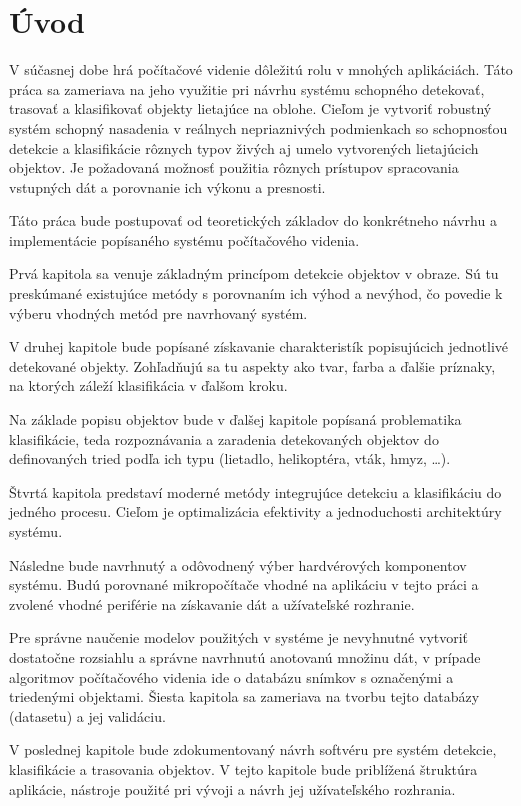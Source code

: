 \chapter*{Úvod}
{}

V súčasnej dobe hrá počítačové videnie dôležitú rolu v mnohých aplikáciách. Táto práca sa zameriava na jeho využitie pri návrhu systému schopného detekovať, trasovať a klasifikovať objekty lietajúce na oblohe. Cieľom je vytvoriť robustný systém schopný nasadenia v reálnych nepriaznivých podmienkach so schopnosťou detekcie a klasifikácie rôznych typov živých aj umelo vytvorených lietajúcich objektov. Je požadovaná možnosť použitia rôznych prístupov spracovania vstupných dát a porovnanie ich výkonu a presnosti.

Táto práca bude postupovať od teoretických základov do konkrétneho návrhu a implementácie popísaného systému počítačového videnia.

Prvá kapitola sa venuje základným princípom detekcie objektov v obraze. Sú tu preskúmané existujúce metódy s porovnaním ich výhod a nevýhod, čo povedie k výberu vhodných metód pre navrhovaný systém.

V druhej kapitole bude popísané získavanie charakteristík popisujúcich jednotlivé detekované objekty. Zohľadňujú sa tu aspekty ako tvar, farba a ďalšie príznaky, na ktorých záleží klasifikácia v ďalšom kroku.

Na základe popisu objektov bude v ďalšej kapitole popísaná problematika klasifikácie, teda rozpoznávania a zaradenia detekovaných objektov do definovaných tried podľa ich typu (lietadlo, helikoptéra, vták, hmyz, \dots).

Štvrtá kapitola predstaví moderné metódy integrujúce detekciu a klasifikáciu do jedného procesu. Cieľom je optimalizácia efektivity a jednoduchosti architektúry systému.

Následne bude navrhnutý a odôvodnený výber hardvérových komponentov systému. Budú porovnané mikropočítače vhodné na aplikáciu v tejto práci a zvolené vhodné periférie na získavanie dát a užívateľské rozhranie.

Pre správne naučenie modelov použitých v systéme je nevyhnutné vytvoriť dostatočne rozsiahlu a správne navrhnutú anotovanú množinu dát, v prípade algoritmov počítačového videnia ide o databázu snímkov s označenými a triedenými objektami. Šiesta kapitola sa zameriava na tvorbu tejto databázy (datasetu) a jej validáciu.

V poslednej kapitole bude zdokumentovaný návrh softvéru pre systém detekcie, klasifikácie a trasovania objektov. V tejto kapitole bude priblížená štruktúra aplikácie, nástroje použité pri vývoji a návrh jej užívateľského rozhrania.

